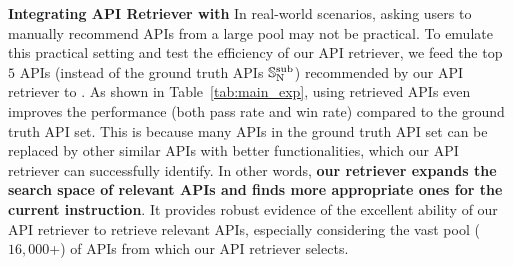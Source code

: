 

\textbf{Integrating API Retriever with \ourmodel} \quad
In real-world scenarios, asking users to manually recommend APIs from a large pool may not be practical.
To emulate this practical setting and test the efficiency of our API retriever, we feed the top $5$ APIs (instead of the ground truth APIs ${\mathbb{S}}_\text{N}^{\text{sub}}$) recommended by our API retriever to \ourmodel. As shown in Table~\ref{tab:main_exp}, using retrieved APIs even improves the performance (both pass rate and win rate) compared to the ground truth API set.
This is because many APIs in the ground truth API set can be replaced by other similar APIs with better functionalities, which our API retriever can successfully identify. In other words, \textbf{our retriever expands the search space of relevant APIs and finds more appropriate ones for the current instruction}.
It provides robust evidence of the excellent ability of our API retriever to retrieve relevant APIs, especially considering the vast pool ($16,000$+) of APIs from which our API retriever selects. 



